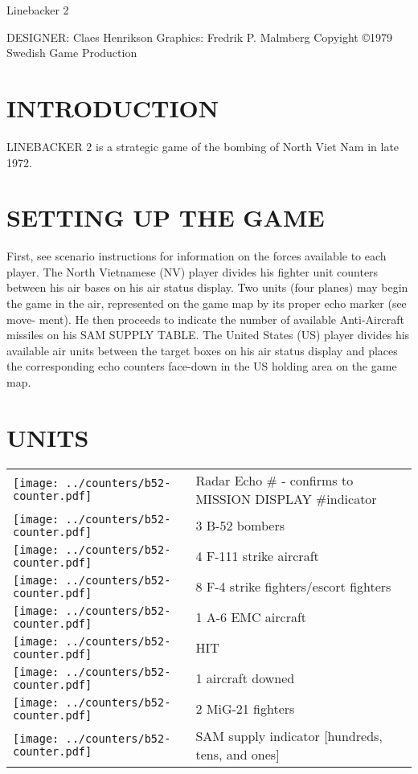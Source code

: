 Linebacker 2

DESIGNER: Claes Henrikson
Graphics: Fredrik P. Malmberg
Copyight ©1979
Swedish Game Production

\section*{INTRODUCTION}
LINEBACKER 2 is a strategic game 
of the bombing of North Viet Nam in 
late 1972.

\section*{SETTING UP THE GAME}
First, see scenario instructions for 
information on the forces available 
to each player. The North Vietnamese 
(NV) player divides his fighter unit 
counters between his air bases on his 
air status display. Two units (four 
planes) may begin the game in the 
air, represented on the game map by 
its proper echo marker (see move- 
ment). He then proceeds to indicate 
the number of available Anti-Aircraft 
missiles on his SAM SUPPLY TABLE. 
The United States (US) player 
divides his available air units between 
the target boxes on his air status 
display and places the corresponding 
echo counters face-down in the US 
holding area on the game map.

\newcommand{\graphic}{\texttt{[image: ../counters/b52-counter.pdf]}}


\section*{UNITS}
\noindent
\begin{tabularx}{\linewidth}{@{} m{0.3in} X @{}}
   \graphic & Radar Echo \# - confirms to MISSION DISPLAY \#indicator \\ 
   \graphic & 3 B-52 bombers \\
   \graphic & 4 F-111 strike aircraft \\
   \graphic & 8 F-4 strike fighters/escort fighters \\
   \graphic & 1 A-6 EMC aircraft \\
   \graphic & HIT \\
   \graphic & 1 aircraft downed \\
   \graphic & 2 MiG-21 fighters \\
   \graphic & SAM supply indicator [hundreds, tens, and ones] \\
 \end{tabularx}
 

